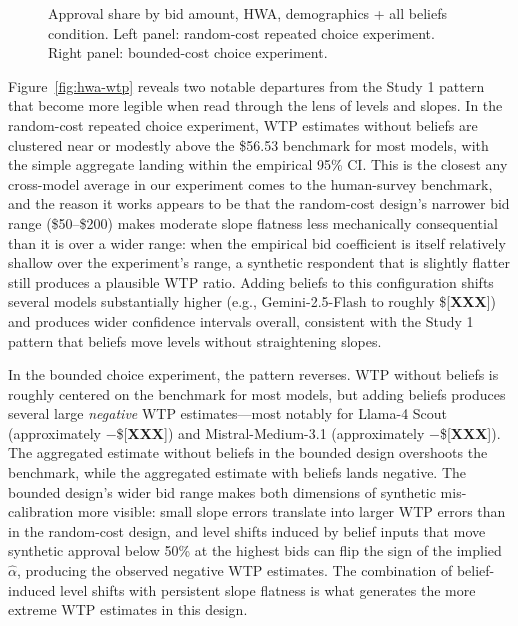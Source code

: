 \documentclass[12pt]{article}
\begin{document}
\begin{figure}[h]
    \centering
    \caption{Approval share by bid amount, HWA, demographics + all
    beliefs condition. Left panel: random-cost repeated choice
    experiment. Right panel: bounded-cost choice experiment.}
    \label{fig:hwa-all-beliefs}
\end{figure}

Figure~\ref{fig:hwa-wtp} reveals two notable departures from the Study
1 pattern that become more legible when read through the lens of levels and slopes. 
In the random-cost repeated choice experiment, WTP estimates without beliefs
are clustered near or modestly above the \$56.53 benchmark for most
models, with the simple aggregate landing within the empirical 95\% CI.
This is the closest any cross-model average in our experiment comes to
the human-survey benchmark, and the reason it works appears to be that
the random-cost design's narrower bid range (\$50--\$200) makes
moderate slope flatness less mechanically consequential than it is over
a wider range: when the empirical bid coefficient is itself relatively
shallow over the experiment's range, a synthetic respondent that is
slightly flatter still produces a plausible WTP ratio. Adding beliefs
to this configuration shifts several models substantially higher (e.g.,
Gemini-2.5-Flash to roughly \$[\textbf{XXX}]) and produces wider
confidence intervals overall, consistent with the Study 1 pattern that
beliefs move levels without straightening slopes.

In the bounded choice experiment, the pattern reverses. WTP without
beliefs is roughly centered on the benchmark for most models, but adding
beliefs produces several large \emph{negative} WTP estimates---most
notably for Llama-4 Scout (approximately $-$\$[\textbf{XXX}]) and
Mistral-Medium-3.1 (approximately $-$\$[\textbf{XXX}]). The aggregated
estimate without beliefs in the bounded design overshoots the benchmark,
while the aggregated estimate with beliefs lands negative. The bounded
design's wider bid range makes both dimensions of synthetic
mis-calibration more visible: small slope errors translate into larger
WTP errors than in the random-cost design, and level shifts induced by
belief inputs that move synthetic approval below 50\% at the highest
bids can flip the sign of the implied $\hat{\alpha}$, producing the
observed negative WTP estimates. The combination of belief-induced level
shifts with persistent slope flatness is what generates the more extreme
WTP estimates in this design.
\end{document}
